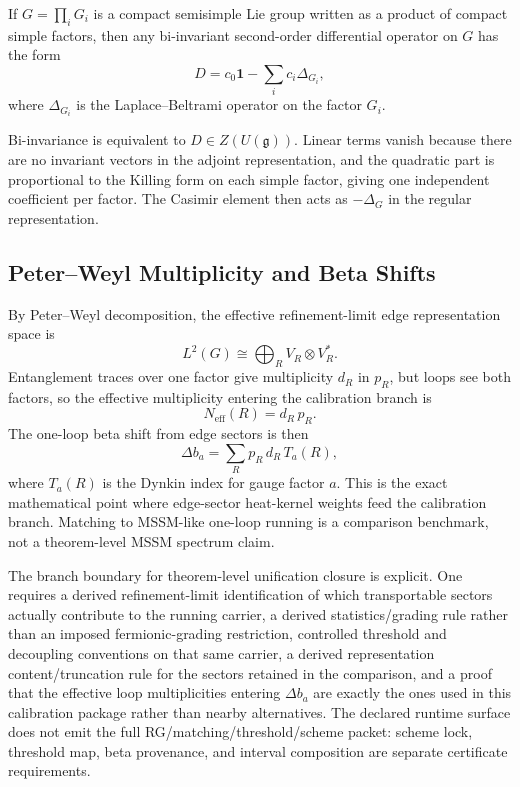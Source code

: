 \begin{lemma}
If \(G=\prod_i G_i\) is a compact semisimple Lie group written as a product of compact simple
factors, then any bi-invariant second-order differential operator on \(G\) has the form
\[
D=c_0\mathbf 1-\sum_i c_i\Delta_{G_i},
\]
where \(\Delta_{G_i}\) is the Laplace--Beltrami operator on the factor \(G_i\).
\end{lemma}

\begin{remark}
Bi-invariance is equivalent to \(D\in Z(U(\mathfrak g))\). Linear terms vanish because there are
no invariant vectors in the adjoint representation, and the quadratic part is proportional to the
Killing form on each simple factor, giving one independent coefficient per factor. The Casimir
element then acts as \(-\Delta_G\) in the regular representation.
\end{remark}

\subsection{Peter--Weyl Multiplicity and Beta Shifts}

By Peter--Weyl decomposition, the effective refinement-limit edge representation space is
\[
L^2(G)\cong \bigoplus_R V_R\otimes V_R^*.
\]
Entanglement traces over one factor give multiplicity \(d_R\) in \(p_R\), but loops see both
factors, so the effective multiplicity entering the calibration branch is
\[
N_{\mathrm{eff}}(R)=d_R\,p_R.
\]
The one-loop beta shift from edge sectors is then
\[
\Delta b_a=\sum_R p_R\,d_R\,T_a(R),
\]
where \(T_a(R)\) is the Dynkin index for gauge factor \(a\). This is the exact mathematical point
where edge-sector heat-kernel weights feed the calibration branch. Matching to
MSSM-like one-loop running is a comparison benchmark, not a theorem-level
MSSM spectrum claim.

The branch boundary for theorem-level unification closure is explicit. One requires a derived
refinement-limit identification of which transportable sectors actually contribute to the running
carrier, a derived statistics/grading rule rather than an imposed fermionic-grading restriction,
controlled threshold and decoupling conventions on that same carrier, a derived representation
content/truncation rule for the sectors retained in the comparison, and a proof that the effective
loop multiplicities entering \(\Delta b_a\) are exactly the ones used in this calibration package
rather than nearby alternatives. The declared runtime surface does not emit the
full RG/matching/threshold/scheme packet: scheme lock, threshold map,
beta provenance, and interval composition are separate certificate requirements.

